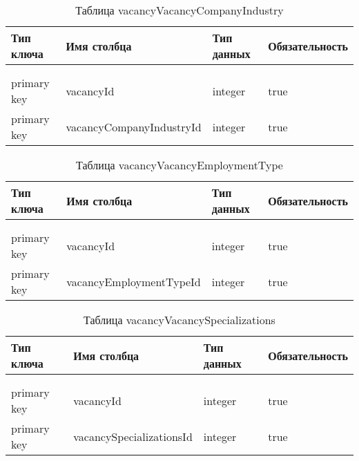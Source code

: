 \begin{xltabular}{\textwidth}{|l|l|p{1.7cm}|X|}
	\caption{Таблица vacancyVacancyCompanyIndustry \label{vacancyVacancyCompanyIndustry:table}}\\ \hline
	\centrow Тип ключа & \centrow Имя столбца & \centrow Тип данных & \centrow Обязательность \\ \hline
	 &  &  &  \\ \hline
	\endfirsthead
	 &  &  &  \\ \hline
	\finishhead
	primary key & vacancyId & integer & true \\ \hline 
	primary key & vacancyCompanyIndustryId & integer & true \\ \hline
\end{xltabular}

\begin{xltabular}{\textwidth}{|l|l|p{1.7cm}|X|}
	\caption{Таблица vacancyVacancyEmploymentType \label{vacancyVacancyEmploymentType:table}}\\ \hline
	\centrow Тип ключа & \centrow Имя столбца & \centrow Тип данных & \centrow Обязательность \\ \hline
	 &  &  &  \\ \hline
	\endfirsthead
	 &  &  &  \\ \hline
	\finishhead
	primary key & vacancyId & integer & true \\ \hline 
	primary key & vacancyEmploymentTypeId & integer & true \\ \hline
\end{xltabular}

\begin{xltabular}{\textwidth}{|l|l|p{1.7cm}|X|}
	\caption{Таблица vacancyVacancySpecializations \label{vacancyVacancySpecializations:table}}\\ \hline
	\centrow Тип ключа & \centrow Имя столбца & \centrow Тип данных & \centrow Обязательность \\ \hline
	 &  &  &  \\ \hline
	\endfirsthead
	 &  &  &  \\ \hline
	\finishhead
	primary key & vacancyId & integer & true \\ \hline 
	primary key & vacancySpecializationsId & integer & true \\ \hline
\end{xltabular}

